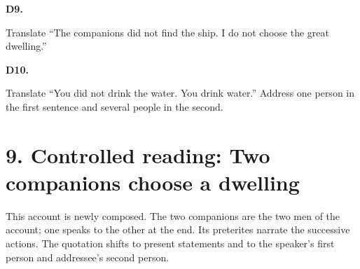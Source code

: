 \par\begin{minipage}{\linewidth}\raggedright
\textbf{D9.}

Translate “The companions did not find the ship. I do not choose the great dwelling.”

\end{minipage}\par\addvspace{4pt}

\par\begin{minipage}{\linewidth}\raggedright
\textbf{D10.}

Translate “You did not drink the water. You drink water.” Address one person in the first sentence and several people in the second.

\end{minipage}\par\addvspace{4pt}

\section*{9. Controlled reading: Two companions choose a dwelling}

This account is newly composed. The two companions are the two men of the account; one speaks to the other at the end. Its preterites narrate the successive actions. The quotation shifts to present statements and to the speaker’s first person and addressee’s second person.

\par\begin{minipage}{\linewidth}\raggedright
{}
\end{minipage}\par

